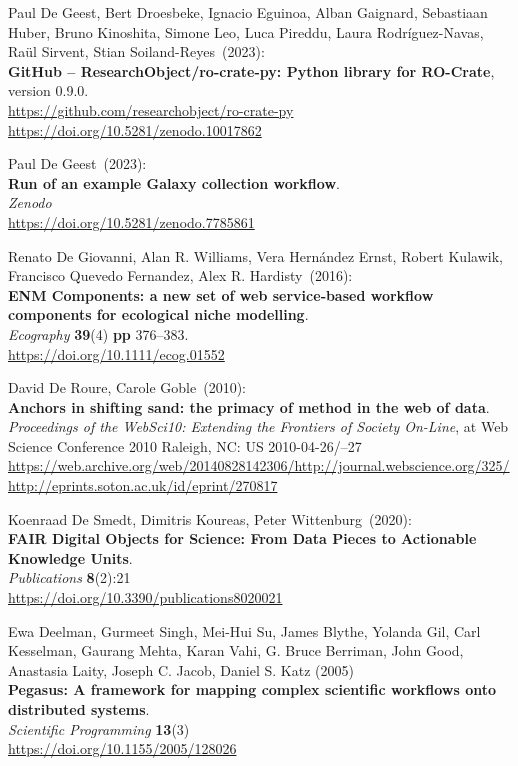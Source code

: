 \begin{thebibliography}{9}
Paul De Geest, Bert Droesbeke, Ignacio Eguinoa, Alban Gaignard, Sebastiaan Huber, Bruno Kinoshita, Simone Leo, Luca Pireddu, Laura Rodríguez-Navas, Raül Sirvent, Stian Soiland-Reyes~(2023): \\
\textbf{GitHub -- ResearchObject/ro-crate-py: Python library for
RO-Crate}, version 0.9.0.\\
\url{https://github.com/researchobject/ro-crate-py}\\
\url{https://doi.org/10.5281/zenodo.10017862}

Paul De Geest~(2023): \\
\textbf{Run of an example Galaxy collection workflow}.\\
\emph{Zenodo}\\
\url{https://doi.org/10.5281/zenodo.7785861}

Renato De Giovanni, Alan R. Williams, Vera Hernández Ernst,
Robert Kulawik, Francisco Quevedo Fernandez, Alex R. Hardisty~(2016): \\
\textbf{ENM Components: a new set of web service‐based workflow
components for ecological niche modelling}.\\
\emph{Ecography}
\textbf{39}(4) \textbf{pp} 376--383.\\
\url{https://doi.org/10.1111/ecog.01552}

David De Roure, Carole Goble~(2010): \\
\textbf{Anchors in shifting sand: the primacy of method in the web of data}. \\
\emph{Proceedings of the WebSci10: Extending the Frontiers of Society On-Line},
at Web Science Conference 2010 Raleigh, NC: US 2010-04-26/--27\\
\url{https://web.archive.org/web/20140828142306/http://journal.webscience.org/325/}\\
\url{http://eprints.soton.ac.uk/id/eprint/270817} 

Koenraad De Smedt, Dimitris Koureas, Peter
Wittenburg~(2020): \\
\textbf{FAIR Digital Objects for Science: From Data Pieces to Actionable
Knowledge Units}.\\
\emph{Publications} \textbf{8}(2):21\\
\url{https://doi.org/10.3390/publications8020021}

Ewa Deelman, Gurmeet Singh, Mei-Hui Su, James Blythe, Yolanda Gil, Carl Kesselman, Gaurang Mehta, Karan Vahi, G. Bruce Berriman, John Good, Anastasia Laity, Joseph C. Jacob, Daniel S. Katz (2005)\\
\textbf{Pegasus: A framework for mapping complex scientific workflows onto distributed systems}.\\
\emph{Scientific Programming} \textbf{13}(3) \\
\url{https://doi.org/10.1155/2005/128026}


\end{thebibliography}

